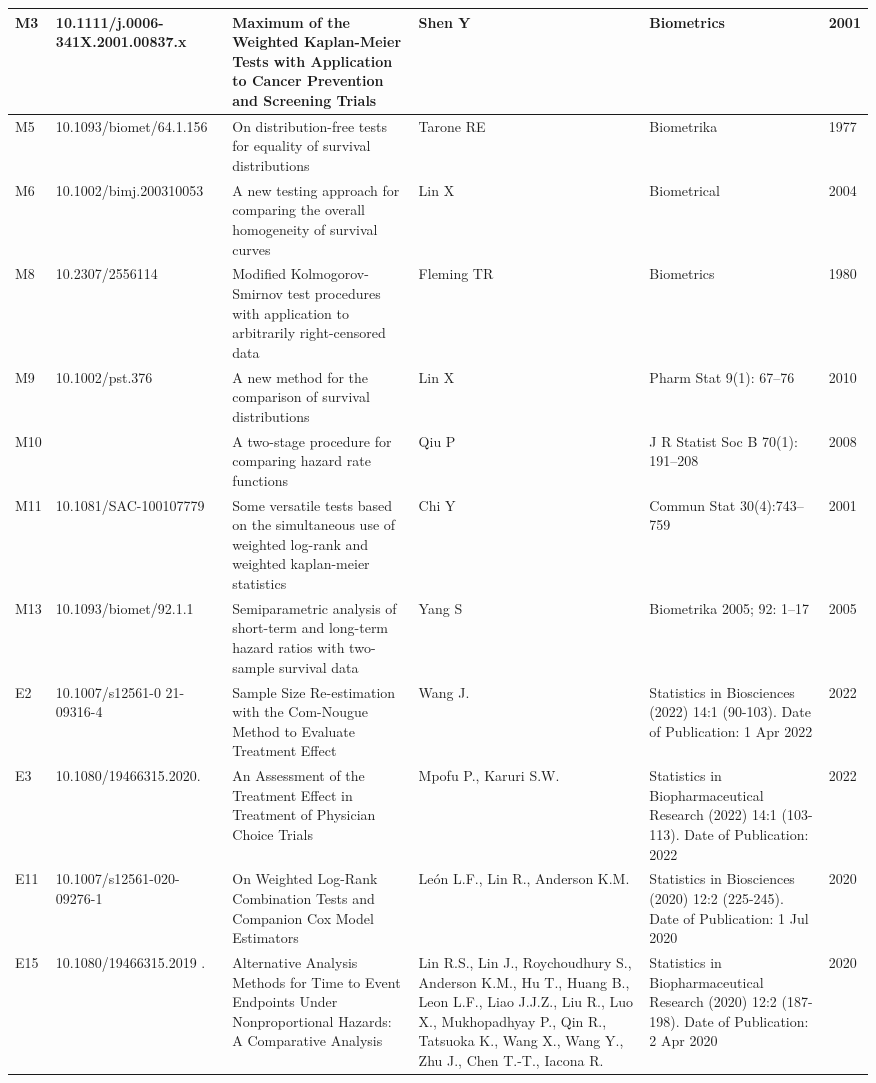 \begin{landscape}
\begin{longtable}{|p{0.3in}|p{1.8in}|p{2.4in}|p{0.68in}|p{0.89in}|p{0.3in}|}
M3 & 10.1111/j.0006-341X.2001.00837.x ~  & Maximum of the Weighted Kaplan-Meier Tests with Application to Cancer Prevention and Screening Trials & Shen Y & Biometrics & 2001 \\ \hline 
M5 & 10.1093/biomet/64.1.156  & On distribution-free tests for equality of survival distributions & Tarone RE & Biometrika & 1977 \\ \hline 
M6 & 10.1002/bimj.200310053  & A new testing approach for comparing the overall homogeneity of survival curves & Lin X & Biometrical & 2004 \\ \hline 
M8 & 10.2307/2556114  & Modified Kolmogorov-Smirnov test procedures with application to arbitrarily right-censored data & Fleming TR & Biometrics & 1980 \\ \hline 
M9 & 10.1002/pst.376  & A new method for the comparison of survival distributions & Lin X & Pharm Stat 9(1): 67--76 & 2010 \\ \hline 
M10 &  & A two-stage procedure for comparing hazard rate functions & Qiu P & J R Statist Soc B 70(1): 191--208 & 2008 \\ \hline 
M11 & 10.1081/SAC-100107779   & Some versatile tests based on the simultaneous use of weighted log-rank and weighted kaplan-meier statistics & Chi Y & Commun Stat 30(4):743--759 & 2001 \\ \hline 
M13 & 10.1093/biomet/92.1.1   & Semiparametric analysis of short-term and long-term hazard ratios with two-sample survival data & Yang S & Biometrika 2005; 92: 1--17 & 2005 \\ \hline 
E2 & 10.1007/s12561-0 21-09316-4 & Sample Size Re-estimation with the Com-Nougue Method to Evaluate Treatment Effect & Wang J. & Statistics in Biosciences (2022) 14:1 (90-103). Date of Publication: 1 Apr 2022 & 2022 \\ \hline 
E3 & 10.1080/19466315.2020.\-1801496  & An Assessment of the Treatment Effect in Treatment of Physician Choice Trials & Mpofu P., Karuri S.W. & Statistics in Biopharmaceutical Research (2022) 14:1 (103-113). Date of Publication: 2022 & 2022 \\ \hline 
E11 & 10.1007/s12561-020-09276-1  & On Weighted Log-Rank Combination Tests and Companion Cox Model Estimators & Le\'{o}n L.F., Lin R., Anderson K.M. & Statistics in Biosciences (2020) 12:2 (225-245). Date of Publication: 1 Jul 2020 & 2020 \\ \hline 
E15 & 10.1080/19466315.2019 .\-1697738  & Alternative Analysis Methods for Time to Event Endpoints Under Nonproportional Hazards: A Comparative Analysis & Lin R.S., Lin J., Roychoudhury S., Anderson K.M., Hu T., Huang B., Leon L.F., Liao J.J.Z., Liu R., Luo X., Mukhopadhyay P., Qin R., Tatsuoka K., Wang X., Wang Y., Zhu J., Chen T.-T., Iacona R. & Statistics in Biopharmaceutical Research (2020) 12:2 (187-198). Date of Publication: 2 Apr 2020 & 2020 \\ \hline 

\end{longtable}
\end{landscape}
